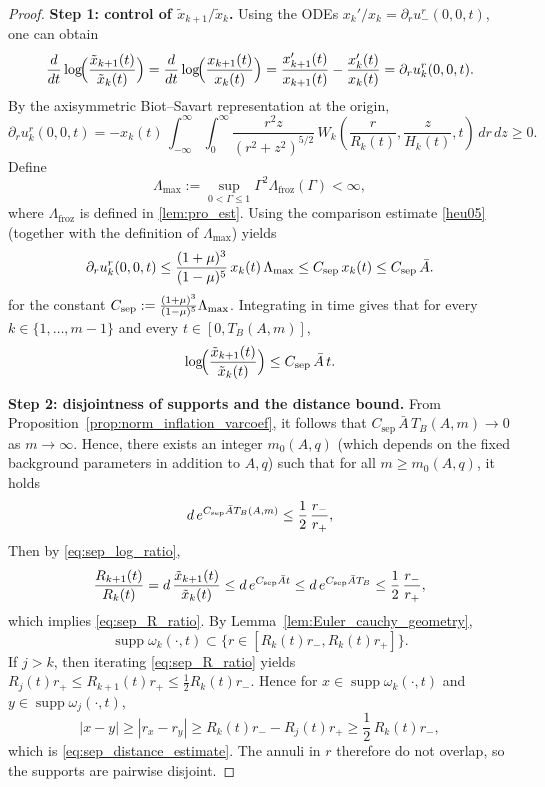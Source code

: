 \documentclass[reqno,11pt]{amsart}
\newcommand{\supp}{\operatorname{supp}}
\begin{document}
\begin{proof}
\textbf{Step 1: control of $\tilde x_{k+1}/\tilde x_k$.}
Using the ODEs $x_k'/x_k=\partial_r u_-^r(0,0,t)$, one can obtain
\[
\frac{d}{dt}\log\!\Bigl(\frac{\tilde x_{k+1}(t)}{\tilde x_k(t)}\Bigr)
=\frac{d}{dt}\log\!\Bigl(\frac{x_{k+1}(t)}{x_k(t)}\Bigr)
=\frac{x'_{k+1}(t)}{x_{k+1}(t)}-\frac{x'_k(t)}{x_k(t)}
=\partial_r u^r_k(0,0,t).
\]
By the axisymmetric Biot--Savart representation at the origin,
\[
\partial_r u^r_k(0,0,t)
=-x_k(t)\,
\int_{-\infty}^\infty \int_{0}^\infty
\frac{r^2z}{(r^2+ z^2)^{5/2}}\,
W_k\left(
        \frac{r}{R_k (t)},
        \frac{z}{H_k(t)}, t
    \right)\,dr\,dz \geq 0.
\]
Define
\[
\Lambda_{\max}:=\sup_{0<\Gamma\le 1}\Gamma^2\Lambda_{\mathrm{froz}}(\Gamma)<\infty,
\]
where $\Lambda_{\mathrm{froz}}$ is defined in \eqref{lem:pro_est}.
Using the comparison estimate \eqref{heu05} (together with the definition of $\Lambda_{\max}$) yields
\[
\partial_r u^r_k(0,0,t)\le \frac{(1+\mu)^3}{(1-\mu)^5}\,x_k(t)\,\Lambda_{\max}\le C_{\rm sep}\,x_k(t)\le C_{\rm sep}\,\bar A.
\]
for the constant $C_{\rm sep}:=\frac{(1+\mu)^3}{(1-\mu)^5}\Lambda_{\max}$.
Integrating in time gives that for every $k\in \{1,\ldots,m-1\}$ and every $t\in[0,T_B(A,m)]$,
\begin{equation}\label{eq:sep_log_ratio}
\log\!\Bigl(\frac{\tilde x_{k+1}(t)}{\tilde x_k(t)}\Bigr)\le C_{\rm sep}\,\bar A\,t.
\end{equation}

\medskip
\noindent \textbf{Step 2: disjointness of supports and the distance bound.}
From Proposition~\ref{prop:norm_inflation_varcoef}, it follows that $C_{\mathrm{sep}} \, \bar A \, T_B(A,m)\to 0$ as $m\to\infty$. Hence, there exists an integer $m_0(A,q)$ (which depends on the fixed background parameters in addition to $A,q$) such that  for all $m\geq m_0(A,q)$, it holds
\begin{equation*}
d\,e^{C_{\rm sep}\bar A T_B(A,m)}\le \frac12\,\frac{r_-}{r_+},
\end{equation*}
Then by \eqref{eq:sep_log_ratio},
\[
\frac{R_{k+1}(t)}{R_k(t)}=d\,\frac{\tilde x_{k+1}(t)}{\tilde x_k(t)}
\le d\,e^{C_{\rm sep}\bar At}
\le d\,e^{C_{\rm sep} \bar A T_B}\le \frac12\,\frac{r_-}{r_+},
\]
which implies \eqref{eq:sep_R_ratio}. By Lemma~\ref{lem:Euler_cauchy_geometry},
\[
\supp \omega_k(\cdot,t)\subset\{r\in[R_k(t)r_-,R_k(t)r_+]\}.
\]
If $j>k$, then iterating \eqref{eq:sep_R_ratio} yields $R_j(t)r_+\le R_{k+1}(t)r_+\le \frac12R_k(t)r_-$. Hence for $x\in \supp \omega_k(\cdot,t)$ and $y\in\supp \omega_j(\cdot,t)$,
\[
|x-y|\ge |r_x-r_y|\ge R_k(t)r_--R_j(t)r_+\ge \frac12\,R_k(t)r_-,
\]
which is \eqref{eq:sep_distance_estimate}. The annuli in $r$ therefore do not overlap, so the supports are pairwise disjoint.
\end{proof}
\end{document}
